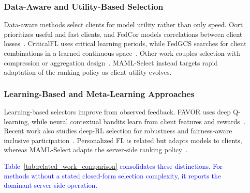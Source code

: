 \documentclass[journal]{IEEEtran}
\newcommand{\revision}[1]{\textcolor{blue}{#1}}
\begin{document}
\subsubsection{Data-Aware and Utility-Based Selection}
Data-aware methods select clients for model utility rather than only speed. Oort prioritizes useful and fast clients, and FedCor models correlations between client losses~\cite{lai2021oort,tang2022fedcor}. CriticalFL uses critical learning periods, while FedGCS searches for client combinations in a learned continuous space~\cite{yan2023criticalfl,ning2024fedgcs}. Other work couples selection with compression or aggregation design~\cite{xu2024federated,tran2026fedimp}. MAML-Select instead targets rapid adaptation of the ranking policy as client utility evolves.

\subsubsection{Learning-Based and Meta-Learning Approaches}
Learning-based selectors improve from observed feedback. FAVOR uses deep Q-learning, while neural contextual bandits learn from client features and rewards~\cite{wang2020optimizing,pan2024contextual}. Recent work also studies deep-RL selection for robustness and fairness-aware inclusive participation~\cite{kazemi2026robust,arisdakessian2026vox}. Personalized FL is related but adapts models to clients, whereas MAML-Select adapts the server-side ranking policy~\cite{fallah2020personalized}.

\revision{Table~\ref{tab:related_work_comparison} consolidates these distinctions. For methods without a stated closed-form selection complexity, it reports the dominant server-side operation.}
\end{document}
